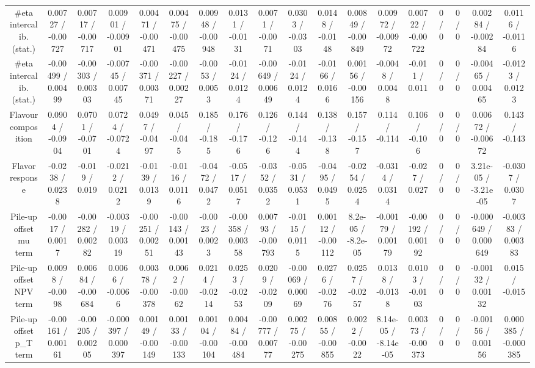 \documentclass[10pt]{article}
\begin{document}
\begin{table}[htbp]
\begin{center}
\begin{tabular}{|c|c|c|c|c|c|c|c|c|c|c|c|c|c|c|c|c|c|}
  #eta intercalib. (stat.) & 0.00727 / -0.00727 & 0.00717 / -0.00717 & 0.00901 / -0.00901 & 0.00471 / -0.00471 & 0.00475 / -0.00475 & 0.00948 / -0.00948 & 0.0131 / -0.0131 & 0.0071 / -0.0071 & 0.0303 / -0.0303 & 0.0148 / -0.0148 & 0.00849 / -0.00849 & 0.00972 / -0.00972 & 0.00722 / -0.00722 & 0 / 0 & 0 / 0 & 0.00284 / -0.00284 & 0.0116 / -0.0116 \\ 
  #eta intercalib. (stat.) & -0.00499 / 0.00499 & -0.00303 / 0.00303 & -0.00745 / 0.00745 & -0.00371 / 0.00371 & -0.00227 / 0.00227 & -0.0053 / 0.0053 & -0.0124 / 0.0124 & -0.00649 / 0.00649 & -0.0124 / 0.0124 & -0.0166 / 0.0166 & 0.00156 / -0.00156 & -0.0048 / 0.0048 & -0.011 / 0.011 & 0 / 0 & 0 / 0 & -0.00465 / 0.00465 & -0.0123 / 0.0123 \\ 
  Flavour composition & 0.0904 / -0.0904 & 0.0701 / -0.0701 & 0.0724 / -0.0724 & 0.0497 / -0.0497 & 0.045 / -0.045 & 0.185 / -0.185 & 0.176 / -0.176 & 0.126 / -0.126 & 0.144 / -0.144 & 0.138 / -0.138 & 0.157 / -0.157 & 0.114 / -0.114 & 0.106 / -0.106 & 0 / 0 & 0 / 0 & 0.00672 / -0.00672 & 0.143 / -0.143 \\ 
  Flavor response & -0.0238 / 0.0238 & -0.019 / 0.019 & -0.0212 / 0.0212 & -0.0139 / 0.0139 & -0.0116 / 0.0116 & -0.0472 / 0.0472 & -0.0517 / 0.0517 & -0.0352 / 0.0352 & -0.0531 / 0.0531 & -0.0495 / 0.0495 & -0.0254 / 0.0254 & -0.0314 / 0.0314 & -0.027 / 0.027 & 0 / 0 & 0 / 0 & 3.21e-05 / -3.21e-05 & -0.0307 / 0.0307 \\ 
  Pile-up offset mu term & -0.0017 / 0.0017 & -0.00282 / 0.00282 & -0.00319 / 0.00319 & -0.00251 / 0.00251 & -0.00143 / 0.00143 & -0.0023 / 0.0023 & -0.00358 / 0.00358 & 0.00793 / -0.00793 & -0.0115 / 0.0115 & 0.00112 / -0.00112 & 8.2e-05 / -8.2e-05 & -0.00179 / 0.00179 & -0.00192 / 0.00192 & 0 / 0 & 0 / 0 & -0.000649 / 0.000649 & -0.00383 / 0.00383 \\ 
  Pile-up offset NPV term & 0.0098 / -0.0098 & 0.00684 / -0.00684 & 0.0066 / -0.0066 & 0.00378 / -0.00378 & 0.0062 / -0.0062 & 0.0214 / -0.0214 & 0.0253 / -0.0253 & 0.0209 / -0.0209 & -0.00069 / 0.00069 & 0.0276 / -0.0276 & 0.0257 / -0.0257 & 0.0138 / -0.0138 & 0.0103 / -0.0103 & 0 / 0 & 0 / 0 & -0.00132 / 0.00132 & 0.015 / -0.015 \\ 
  Pile-up offset p_{T} term & -0.00161 / 0.00161 & -0.00205 / 0.00205 & -0.000397 / 0.000397 & 0.00149 / -0.00149 & 0.00133 / -0.00133 & 0.00104 / -0.00104 & 0.00484 / -0.00484 & -0.00777 / 0.00777 & 0.00275 / -0.00275 & 0.00855 / -0.00855 & 0.0022 / -0.0022 & 8.14e-05 / -8.14e-05 & 0.00373 / -0.00373 & 0 / 0 & 0 / 0 & -0.00156 / 0.00156 & 0.000385 / -0.000385 \\ 

\end{tabular}
\end{center}
\end{table}
\end{document}
